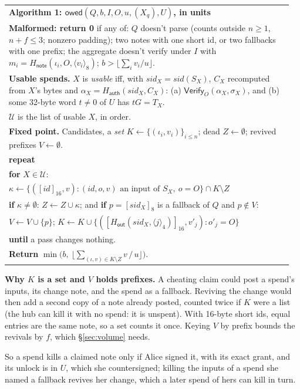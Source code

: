 \documentclass[11pt]{article}
\theoremstyle{plain}
\theoremstyle{definition}
\newcommand{\be}[2]{\langle #1\rangle_{#2}}
\newcommand{\pre}[2]{[#1]_{#2}}
\newcommand{\Ht}[1]{H_{\textsf{#1}}}
\newcommand{\Vfy}{\mathsf{Verify}}
\newcommand{\sid}{\mathit{sid}}
\newcommand{\owed}{\mathsf{owed}}
\newenvironment{algobox}[1]
  {\par\smallskip\noindent\begin{tabular}{|p{0.955\linewidth}|}\hline\textbf{#1}\\[2pt]}
  {\\\hline\end{tabular}\par\smallskip}
\begin{document}
\begin{algobox}{Algorithm 1: $\owed(Q, b, I, O, u, (X_q), U)$, in units}
\textbf{Malformed: return 0} if any of:
$Q$ doesn't parse (counts outside $n \ge 1$, $n + f \le 3$; nonzero padding);
two notes with one short id, or two fallbacks with one prefix;
the aggregate doesn't verify under $I$ with $m_i = \Ht{note}(\iota_i, O, \be{v_i}{8})$;
$b > \lfloor \sum_i v_i / u\rfloor$.\\[3pt]
\textbf{Usable spends.} $X$ is \emph{usable} iff, with $\sid_X = \sid(S_X)$,
$C_X$ recomputed from $X$'s bytes and $\alpha_X = \Ht{auth}(\sid_X, C_X)$:
\quad (a) $\Vfy_O(\alpha_X, \sigma_X)$, and
\quad (b) some 32-byte word $t \ne 0$ of $U$ has $tG = T_X$.\\
$\mathcal{U}$ is the list of usable $X$, in order.\\[3pt]
\textbf{Fixed point.} Candidates, a \emph{set} $K \leftarrow \{(\iota_i, v_i)\}_{i \le n}$; dead $Z \leftarrow \emptyset$; revived prefixes $V \leftarrow \emptyset$.\\
\textbf{repeat}\\
\quad \textbf{for} $X \in \mathcal{U}$:\\
\quad\quad $\kappa \leftarrow \{(\pre{\mathit{id}}{16}, v) : (\mathit{id}, o, v) \text{ an input of } S_X,\ o = O\} \cap K \setminus Z$\\
\quad\quad \textbf{if} $\kappa \ne \emptyset$: $Z \leftarrow Z \cup \kappa$; and \textbf{if} $p = \pre{\sid_X}{8}$ is a fallback of $Q$ and $p \notin V$:\\
\quad\quad\quad $V \leftarrow V \cup \{p\}$; $K \leftarrow K \cup \{(\pre{\Ht{out}(\sid_X, \be{j}{4})}{16}, v'_j) : o'_j = O\}$\\
\textbf{until} a pass changes nothing.\\[3pt]
\textbf{Return} $\min\big(b,\ \big\lfloor \sum_{(\iota, v) \in K \setminus Z} v \,/\, u \big\rfloor\big)$.
\end{algobox}

\textbf{Why $K$ is a set and $V$ holds prefixes.} A cheating claim
could post a spend's inputs, its change note, and the spend as a
fallback. Reviving the change would then add a second copy of a note
already posted, counted twice if $K$ were a list (the hub can kill it
with no spend: it is unspent). With 16-byte short ids, equal entries are
the same note, so a set counts it once. Keying $V$ by prefix bounds the
revivals by $f$, which \S\ref{sec:volume} needs.

So a spend kills a claimed note only if Alice signed it, with its exact
grant, and its unlock is in $U$, which she countersigned; killing the
inputs of a spend she named a fallback revives her change, which a later
spend of hers can kill in turn.
\end{document}
